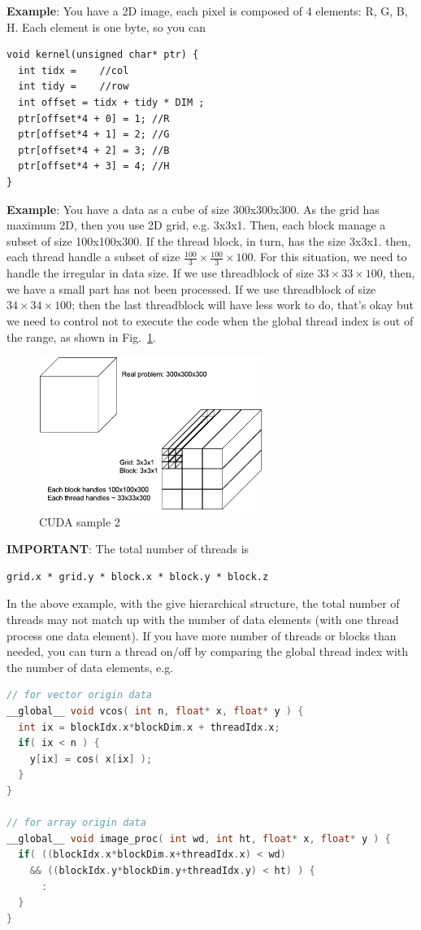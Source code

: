 {\bf Example}: You have a 2D image, each pixel is composed of 4 elements: R, G,
B, H. Each element is one byte, so you can 
\begin{lstlisting}
void kernel(unsigned char* ptr) {
  int tidx =    //col
  int tidy =    //row
  int offset = tidx + tidy * DIM ;
  ptr[offset*4 + 0] = 1; //R
  ptr[offset*4 + 1] = 2; //G
  ptr[offset*4 + 2] = 3; //B
  ptr[offset*4 + 3] = 4; //H
}
\end{lstlisting}


{\bf Example}: You have a data as a cube of size 300x300x300. As the
grid has maximum 2D, then you use 2D grid, e.g. 3x3x1. Then, each
block manage a subset of size 100x100x300. If the thread block, in
turn, has the size 3x3x1. then, each thread handle a subset of size
$\frac{100}{3}\times \frac{100}{3}\times 100$. For this situation, we
need to handle the irregular in data size. If we use threadblock of
size $33\times 33\times 100$, then, we have a small part has not been
processed. If we use threadblock of size $34\times 34\times 100$; then
the last threadblock will have less work to do, that's okay but we
need to control not to execute the code when the global thread index
is out of the range, as shown in Fig.~\ref{fig:cuda_sample2}.

\begin{figure}[hbt]
  \centerline{\includegraphics[height=5cm,
    angle=0]{./images/cuda_sample2.eps}}
\caption{CUDA sample 2}
\label{fig:cuda_sample2}
\end{figure}

{\bf IMPORTANT}: The total number of threads is
\begin{verbatim}
grid.x * grid.y * block.x * block.y * block.z
\end{verbatim}
In the above example, with the give hierarchical structure, the total
number of threads may not match up with the number of data elements
(with one thread process one data element). If you have more number of
threads or blocks than needed, you can turn a thread on/off by
comparing the global thread index with the number of data elements,
e.g.
\begin{lstlisting}[language=c]
// for vector origin data
__global__ void vcos( int n, float* x, float* y ) {
  int ix = blockIdx.x*blockDim.x + threadIdx.x;
  if( ix < n ) {
    y[ix] = cos( x[ix] );
  }
}

// for array origin data
__global__ void image_proc( int wd, int ht, float* x, float* y ) {
  if( ((blockIdx.x*blockDim.x+threadIdx.x) < wd)
    && ((blockIdx.y*blockDim.y+threadIdx.y) < ht) ) {
      :
  }
}
\end{lstlisting}

